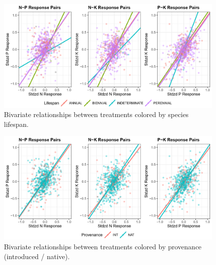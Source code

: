 \documentclass[twoside,12pt,final]{ucthesis-CA2012}
\begin{document}
\begin{ucmainmatter}
\begin{table}[ht]
\end{table}
\begin{figure}
\centering
\includegraphics[width=\textwidth,height=0.4\textheight]{figure/AppFig1_1.png}
\caption{Bivariate relationships between treatments colored by species lifespan. \label{app-1-1}}
\end{figure}
\begin{figure}
\centering
\includegraphics[width=\textwidth,height=0.4\textheight]{figure/AppFig1_2.png}
\caption{Bivariate relationships between treatments colored by provenance (introduced / native). \label{app-1-2}}
\end{figure}
\hypertarget{chapter-2-supporting-information}{%
}
\end{ucmainmatter}
\end{document}
